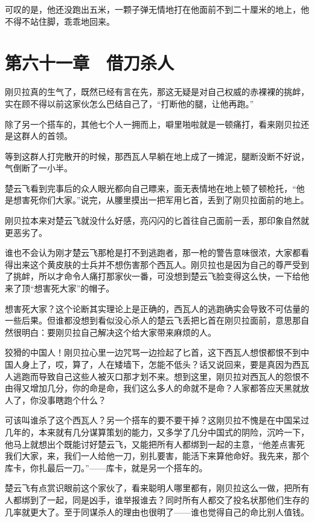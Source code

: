 可叹的是，他还没跑出五米，一颗子弹无情地打在他面前不到二十厘米的地上，他不得不站住脚，乖乖地回来。

\section{第六十一章　借刀杀人}

刚贝拉真的生气了，既然已经有言在先，那这无疑是对自己权威的赤裸裸的挑衅，实在顾不得以前这家伙怎么巴结自己了，“打断他的腿，让他再跑。”

除了另一个搭车的，其他七个人一拥而上，噼里啪啦就是一顿痛打，看来刚贝拉还是这群人的首领。

等到这群人打完散开的时候，那西瓦人早躺在地上成了一摊泥，腿断没断不好说，气倒断了一小半。

楚云飞看到完事后的众人眼光都向自己瞟来，面无表情地在地上顿了顿枪托，“他是想害死你们大家。”说完，从腰里摸出一把军用匕首，丢到了刚贝拉面前的地上。

刚贝拉本来对楚云飞就没什么好感，亮闪闪的匕首往自己面前一丢，那印象自然就更恶劣了。

谁也不会认为刚才楚云飞那枪是打不到逃跑者，那一枪的警告意味很浓，大家都看得出来这个黄皮肤的士兵并不想伤害那个西瓦人。刚贝拉也是因为自己的尊严受到了挑衅，所以才命令人痛打那家伙一番，可没想到楚云飞脸变得这么快，一下给他来了顶“想害死大家”的帽子。

想害死大家？这个论断其实理论上是正确的，西瓦人的逃跑确实会导致不可估量的一些后果。但谁都没想到看似没心杀人的楚云飞丢把匕首在刚贝拉面前，意思那自然很明白：要刚贝拉自己解决这个给大家带来麻烦的人。

狡猾的中国人！刚贝拉心里一边咒骂一边捡起了匕首，这下西瓦人想恨都恨不到中国人身上了，哎，算了，人在矮墙下，怎能不低头？话又说回来，要是真因为西瓦人逃跑而导致自己这些人被灭口那才划不来。想到这里，刚贝拉对西瓦人的怨恨不由得又增加几分，你的命是命，我们这么多人的命就不是命？人家都答应天黑就放人了，你没事瞎跑个什么？

可该叫谁杀了这个西瓦人？另一个搭车的要不要干掉？这刚贝拉不愧是在中国呆过几年的，本来就有几分谋算策划的能力，又多学了几分中国式的阴险，沉吟一下，他马上就想出个既能讨好楚云飞，又能把所有人都绑到一起的主意，“他差点害死我们大家，来，我们一人给他一刀，别扎要害，能活下来算他命好。我先来，那个库卡，你扎最后一刀。”——库卡，就是另一个搭车的。

楚云飞有点赏识眼前这个家伙了，看来聪明人哪里都有，刚贝拉这么一做，把所有人都绑到了一起，同是凶手，谁举报谁去？同时所有人都交了投名状那他们生存的几率就更大了。至于同谋杀人的理由也很明了——谁也觉得自己的命比别人值钱。

